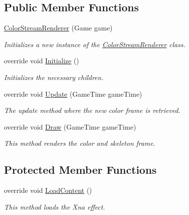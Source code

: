 \subsection*{Public Member Functions}
\begin{DoxyCompactItemize}
\item 
\hyperlink{class_microsoft_1_1_samples_1_1_kinect_1_1_avateering_1_1_color_stream_renderer_af607dd1f65442db88e01a99018ec1735}{Color\+Stream\+Renderer} (Game game)
\begin{DoxyCompactList}\small\item\em Initializes a new instance of the \hyperlink{class_microsoft_1_1_samples_1_1_kinect_1_1_avateering_1_1_color_stream_renderer}{Color\+Stream\+Renderer} class. \end{DoxyCompactList}\item 
override void \hyperlink{class_microsoft_1_1_samples_1_1_kinect_1_1_avateering_1_1_color_stream_renderer_aa6e32fc3aae3a1f9b49d547dba63c033}{Initialize} ()
\begin{DoxyCompactList}\small\item\em Initializes the necessary children. \end{DoxyCompactList}\item 
override void \hyperlink{class_microsoft_1_1_samples_1_1_kinect_1_1_avateering_1_1_color_stream_renderer_a8d596f939054c20ac74cb349a1a6562c}{Update} (Game\+Time game\+Time)
\begin{DoxyCompactList}\small\item\em The update method where the new color frame is retrieved. \end{DoxyCompactList}\item 
override void \hyperlink{class_microsoft_1_1_samples_1_1_kinect_1_1_avateering_1_1_color_stream_renderer_aa0560415311dae0e40e0366abbe779a5}{Draw} (Game\+Time game\+Time)
\begin{DoxyCompactList}\small\item\em This method renders the color and skeleton frame. \end{DoxyCompactList}\end{DoxyCompactItemize}
\subsection*{Protected Member Functions}
\begin{DoxyCompactItemize}
\item 
override void \hyperlink{class_microsoft_1_1_samples_1_1_kinect_1_1_avateering_1_1_color_stream_renderer_af93996a406cb05d3ee779c94a2537d94}{Load\+Content} ()
\begin{DoxyCompactList}\small\item\em This method loads the Xna effect. \end{DoxyCompactList}\end{DoxyCompactItemize}
